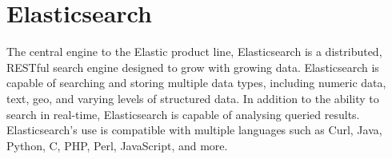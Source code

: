 \section{Elasticsearch}

The central engine to the Elastic product line, Elasticsearch is a distributed,
RESTful search engine designed to grow with growing data. Elasticsearch is
capable of searching and storing multiple data types, including numeric data,
text, geo, and varying levels of structured data. In addition to the ability to
search in real-time, Elasticsearch is capable of analysing queried
results. Elasticsearch's use is compatible with multiple languages such as Curl,
Java, Python, C, PHP, Perl, JavaScript, and more\cite{Elasticsearch}.
